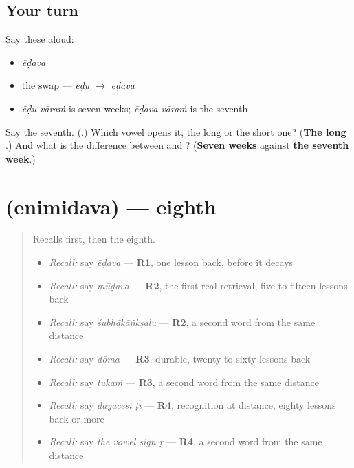 \subsection*{Your turn}
Say these aloud:

\begin{itemize}
\raggedright
  \item \emph{ēḍava}
  \item the swap — \emph{ēḍu} $\to$ \emph{ēḍava}
  \item \emph{ēḍu vāraṁ} is seven weeks; \emph{ēḍava vāraṁ} is the seventh
\end{itemize}

\begin{tcolorbox}[breakable,colback=teal!4,colframe=teal!35!black,title={Before you move on}]
Say the seventh. (\textbf{}.) Which vowel opens it, the long or the short one? (\textbf{The long }.) And what is the difference between \emph{ } and \emph{ }? (\textbf{Seven weeks} against \textbf{the seventh week}.)
\end{tcolorbox}
\section[\texorpdfstring{\te{ఎనిమిదవ} (enimidava)}{ఎనిమిదవ (enimidava)}]{ (enimidava) — eighth}

\label{lesson:TE-C82-eighth}



\begin{quote}
Recalls first, then the eighth.

\begin{itemize}
\raggedright
  \item \emph{Recall:} say \emph{ēḍava} — \textbf{R1}, one lesson back, before it decays
  \item \emph{Recall:} say \emph{mūḍava} — \textbf{R2}, the first real retrieval, five to fifteen lessons back
  \item \emph{Recall:} say \emph{śubhākāṅkṣalu} — \textbf{R2}, a second word from the same distance
  \item \emph{Recall:} say \emph{dōma} — \textbf{R3}, durable, twenty to sixty lessons back
  \item \emph{Recall:} say \emph{tūkaṁ} — \textbf{R3}, a second word from the same distance
  \item \emph{Recall:} say \emph{dayacēsi ṭī} — \textbf{R4}, recognition at distance, eighty lessons back or more
  \item \emph{Recall:} say \emph{the vowel sign ṛ} — \textbf{R4}, a second word from the same distance
\end{itemize}
\end{quote}

